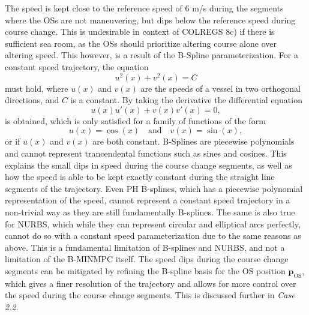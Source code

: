 The speed is kept close to the reference speed of 6 m/s during the segments where the OSs are not maneuvering, but dips below the reference speed during course change.  This is undesirable in context of COLREGS 8c) if there is sufficient sea room, as the OSs should prioritize altering course alone over altering speed.  This however, is a result of the B-Spline parameterization. For a constant speed trajectory, the equation
\begin{equation*}
    u^2(x) + v^2(x) = C
\end{equation*}
must hold, where $u(x)$ and $v(x)$ are the speeds of a vessel in two orthogonal directions, and $C$ is a constant. By taking the derivative the differential equation
\begin{equation*}
    u(x)u'(x) + v(x)v'(x) = 0,
\end{equation*}
is obtained, which is only satisfied for a family of functions of the form
\begin{equation*}
    u(x) = \cos(x) \quad \text{and} \quad v(x) = \sin(x),
\end{equation*}
or if $u(x)$ and $v(x)$ are both constant.  B-Splines are piecewise polynomials and cannot represent trancendental functions such as sines and cosines.  This explains the small dips in speed during the course change segments, as well as how the speed is able to be kept exactly constant during the straight line segments of the trajectory.  Even PH B-splines, which has a piecewise polynomial representation of the speed, cannot represent a constant speed trajectory in a non-trivial way as they are still fundamentally B-splines.  The same is also true for NURBS, which while they can represent circular and elliptical arcs perfectly, cannot do so with a constant speed parameterization due to the same reasons as above.  This is a fundamental limitation of B-splines and NURBS, and not a limitation of the B-MINMPC itself.  The speed dips during the course change segments can be mitigated by refining the B-spline basis for the OS position $\mathbf p_\text{OS}$, which gives a finer resolution of the trajectory and allows for more control over the speed during the course change segments. This is discussed further in \emph{Case 2.2}.



